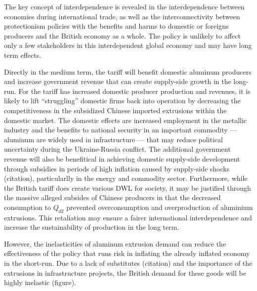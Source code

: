 \documentclass[a4paper,12pt]{article}
\begin{document}
The key concept of interdependence is revealed in the interdependence between economies during international trade, as well as the interconnectivity between protectionism policies with the benefits and harms to domestic or foreigns producers and the British economy as a whole. The policy is unlikely to affect only a few stakeholders in this interdependent global economy and may have long term effects.


Directly in the medium term, the tariff will benefit domestic aluminum producers and increase government revenue that can create supply-side growth in the long-run. For the tariff has increased domestic producer production and revenues, it is likely to lift ``struggling'' domestic firms back into operation by decreasing the competitiveness in the subsidized Chinese imported extrusions within the domestic market. The domestic effects are increased employment in the metallic industry and the benefits to national security in an important commodity --- aluminum are widely used in infrastructure --- that may reduce political uncertainty during the Ukraine-Russia conflict. The additional government revenue will also be benefitical in achieving domestic supply-side development through subsidies in periods of high inflation caused by supply-side shocks (citation), particularlly in the energy and commodity sector. Furthermore, while the British tariff does create various DWL for society, it may be justified through the massive alleged subsides of Chinese producers in that the decreased consumption to $Q_{d2}$ prevented overconsumption and overproduction of aluminium extrusions. This retaliation may ensure a fairer international interdependence and increase the sustainability of production in the long term.

However, the inelasticities of aluminum extrusion demand can reduce the effectiveness of the policy that runs risk in inflating the already inflated economy in the short-run. Due to a lack of substitutes (citation) and the importance of the extrusions in infrastructure projects, the British demand for these goods will be highly inelastic (figure).








\end{document}
